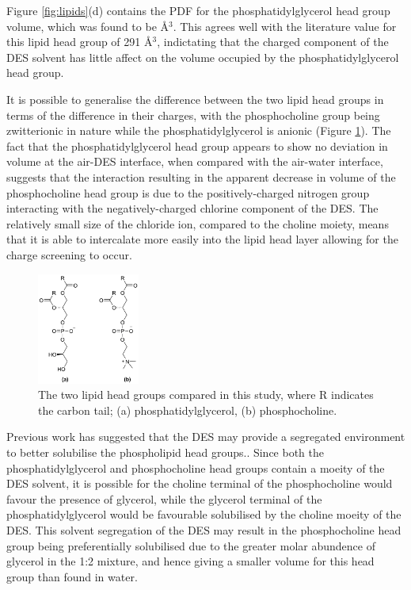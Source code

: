 \documentclass[twoside,twocolumn,9pt]{article}
\begin{document}
Figure \ref{fig:lipids}(d) contains the PDF for the phosphatidylglycerol head group volume, which was found to be  \AA$^{3}$. This agrees well with the literature value for this lipid head group of 291 \AA$^{3}$,\cite{Pan2012} indictating that the charged component of the DES solvent has little affect on the volume occupied by the phosphatidylglycerol head group. 

It is possible to generalise the difference between the two lipid head groups in terms of the difference in their charges, with the phosphocholine group being zwitterionic in nature while the phosphatidylglycerol is anionic (Figure \ref{fig:heads}). The fact that the phosphatidylglycerol head group appears to show no deviation in volume at the air-DES interface, when compared with the air-water interface, suggests that the interaction resulting in the apparent decrease in volume of the phosphocholine head group is due to the positively-charged nitrogen group interacting with the negatively-charged chlorine component of the DES. The relatively small size of the chloride ion, compared to the choline moiety, means that it is able to intercalate more easily into the lipid head layer allowing for the charge screening to occur. 

\begin{figure}
	\centering
	\includegraphics[width=0.30\textwidth]{figures/head_groups}
	\caption{The two lipid head groups compared in this study, where R indicates the carbon tail; (a) phosphatidylglycerol, (b) phosphocholine.}
	\label{fig:heads}
\end{figure}

Previous work has suggested that the DES may provide a segregated environment to better solubilise the phospholipid head groups.\cite{Bryant2016,Bryant2017}. Since both the phosphatidylglycerol and phosphocholine head groups contain a moeity of the DES solvent, it is possible for the choline terminal of the phosphocholine would favour the presence of glycerol, while the glycerol terminal of the phosphatidylglycerol would be favourable solubilised by the choline moeity of the DES. This solvent segregation of the DES may result in the phosphocholine head group being preferentially solubilised due to the greater molar abundence of glycerol in the 1:2 mixture, and hence giving a smaller volume for this head group than found in water.
\end{document}
